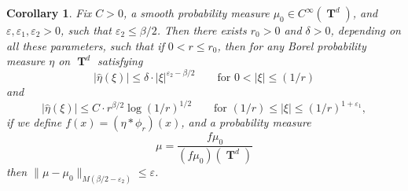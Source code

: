 \documentclass[dvipsnames,letterpaper,12pt]{article}
\numberwithin{equation}{section}
\DeclareMathOperator{\TT}{\mathbf{T}}
\newtheorem{corollary}[theorem]{Corollary}
\numberwithin{theorem}{section}
\begin{document}
\begin{corollary} \label{lemmaIOJDD23124}
    Fix $C > 0$, a smooth probability measure $\mu_0 \in C^\infty(\TT^d)$, and $\varepsilon,\varepsilon_1,\varepsilon_2 > 0$, such that $\varepsilon_2 \leq \beta/2$. Then there exists $r_0 > 0$ and $\delta > 0$, depending on all these parameters, such that if $0 < r \leq r_0$, then for any Borel probability measure $\eta$ on $\TT^d$ satisfying
    \begin{equation} \label{equationADOIJWAOIDJAD}
        \left| \widehat{\eta}(\xi) \right| \leq \delta \cdot |\xi|^{\varepsilon_2-\beta/2}\quad\quad\text{for $0 < |\xi| \leq (1/r)$}
    \end{equation}
    and
    \begin{equation} \label{equationIAOIDJAOICJOIBJOIEVJ2}
        \left| \widehat{\eta}(\xi) \right| \leq C \cdot r^{\beta/2} \log(1/r)^{1/2} \quad\quad\text{for $(1/r) \leq |\xi| \leq (1/r)^{1 + \varepsilon_1}$},
    \end{equation}
    if we define $f(x) = (\eta * \phi_r)(x)$, and a probability measure
    \[ \mu = \frac{f \mu_0}{(f \mu_0)(\TT^d)} \]
    then $\| \mu - \mu_0 \|_{M(\beta/2-\varepsilon_2)} \leq \varepsilon$.
\end{corollary}
\end{document}
